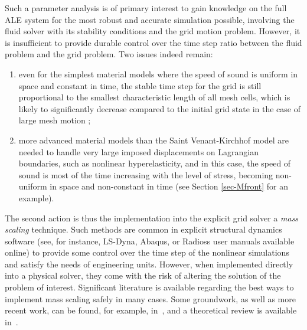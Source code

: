Such a parameter analysis is of primary interest to gain knowledge on the full ALE system for the most robust and accurate simulation possible, involving the fluid solver with its stability conditions and the grid motion problem. However, it is insufficient to provide durable control over the time step ratio between the fluid problem and the grid problem. Two issues indeed remain:
\begin{enumerate}
    \item even for the simplest material models where the speed of sound is uniform in space and constant in time, the stable time step for the grid is still proportional to the smallest characteristic length of all mesh cells, which is likely to significantly decrease compared to the initial grid state in the case of large mesh motion ;
    \item more advanced material models than the Saint Venant-Kirchhof model are needed to handle very large imposed displacements on Lagrangian boundaries, such as nonlinear hyperelasticity, and in this case, the speed of sound is most of the time increasing with the level of stress, becoming non-uniform in space and non-constant in time (see Section \ref{sec-Mfront} for an example).
\end{enumerate}

The second action is thus the implementation into the explicit grid solver  a \textit{mass scaling} technique. Such methods are common in explicit structural dynamics software (see, for instance, LS-Dyna, Abaqus, or Radioss user manuals available online) to provide some control over the time step of the nonlinear simulations and satisfy the needs of engineering units. However, when implemented directly into a physical solver, they come with the risk of altering the solution of the problem of interest. Significant literature is available regarding the best ways to implement mass scaling safely in many cases. Some groundwork, as well as more recent work, can be found, for example, in~\cite{olovsson_selective_2005, stoter_critical_2023}, and a theoretical review is available in~\cite{voet_theoretical_2024}.

